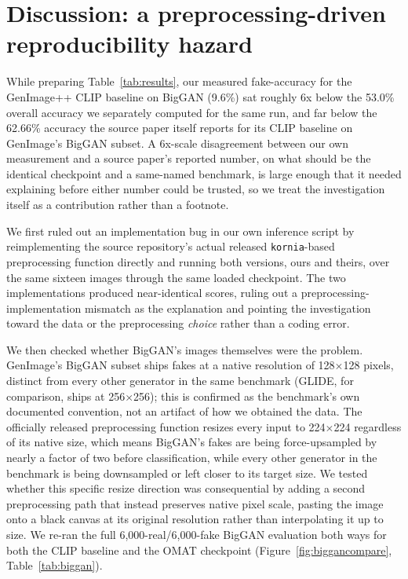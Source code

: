 \documentclass[3p,times,procedia]{elsarticle}
\begin{document}
\section{Discussion: a preprocessing-driven reproducibility hazard}
\label{sec:discussion}

While preparing Table~\ref{tab:results}, our measured fake-accuracy for
the GenImage++ CLIP baseline on BigGAN (9.6\%) sat roughly 6x below the
53.0\% overall accuracy we separately computed for the same run, and far
below the 62.66\% accuracy the source paper itself reports for its CLIP
baseline on GenImage's BigGAN subset. A 6x-scale disagreement between our
own measurement and a source paper's reported number, on what should be
the identical checkpoint and a same-named benchmark, is large enough that
it needed explaining before either number could be trusted, so we treat
the investigation itself as a contribution rather than a footnote.

We first ruled out an implementation bug in our own inference script by
reimplementing the source repository's actual released \texttt{kornia}-based
preprocessing function directly and running both versions, ours and
theirs, over the same sixteen images through the same loaded checkpoint.
The two implementations produced near-identical scores, ruling out a
preprocessing-implementation mismatch as the explanation and pointing the
investigation toward the data or the preprocessing \emph{choice} rather
than a coding error.

We then checked whether BigGAN's images themselves were the problem.
GenImage's BigGAN subset ships fakes at a native resolution of
128$\times$128 pixels, distinct from every other generator in the same
benchmark (GLIDE, for comparison, ships at 256$\times$256); this is
confirmed as the benchmark's own documented convention, not an artifact of
how we obtained the data. The officially released preprocessing function
resizes every input to 224$\times$224 regardless of its native size, which
means BigGAN's fakes are being force-upsampled by nearly a factor of two
before classification, while every other generator in the benchmark is
being downsampled or left closer to its target size. We tested whether
this specific resize direction was consequential by adding a second
preprocessing path that instead preserves native pixel scale, pasting the
image onto a black canvas at its original resolution rather than
interpolating it up to size. We re-ran the full 6{,}000-real/6{,}000-fake
BigGAN evaluation both ways for both the CLIP baseline and the OMAT
checkpoint (Figure~\ref{fig:biggancompare}, Table~\ref{tab:biggan}).
\end{document}
